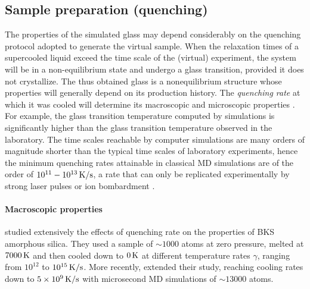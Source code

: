 \subsection{Sample preparation (quenching)}  \label{sec:silica-quenching}
The properties of the simulated glass may depend considerably on the quenching protocol adopted to generate the virtual sample. 
When the relaxation times of a supercooled liquid exceed the time scale of the (virtual) experiment, the system will be in a non-equilibrium state and undergo a glass transition, provided it does not crystallize. The thus obtained glass is a nonequilibrium structure whose properties will generally depend on its production history. The \emph{quenching rate} at which it was cooled will determine its macroscopic and microscopic properties \cite{Vollmayr1996}. 
For example, the glass transition temperature computed by simulations is significantly higher than the glass transition temperature observed in the laboratory. 
The time scales reachable by computer simulations are many orders of magnitude shorter than the typical time scales of laboratory experiments, hence the minimum quenching rates attainable in classical MD simulations are of the order of $10^{11}-10^{13}\,\mathrm{K/s}$, a rate that can only be replicated experimentally by strong laser pulses or ion bombardment \cite{Soules2011}.

\paragraph{Macroscopic properties}
\textcite{Vollmayr1996} studied extensively the effects of quenching rate on the properties of BKS amorphous silica. They used a sample of $\sim 1000$ atoms at zero pressure, melted at $7000\,\mathrm{K}$ and then cooled down to $0\,\mathrm{K}$ at different temperature rates $\gamma$, ranging from $10^{12}$ to $10^{15}\,\mathrm{K/s}$. More recently, \textcite{Lane2015} extended their study, reaching cooling rates down to $5\times 10^{9}\,\mathrm{K/s}$ with microsecond MD simulations of $\sim 13000$ atoms.


